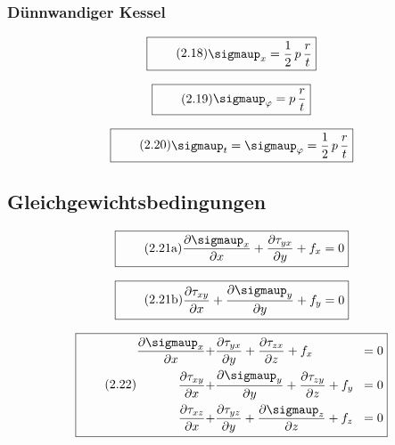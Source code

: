 \documentclass[11pt]{article}
\newcommand{\1}{ {\mathds{1}} }
\renewcommand{\sigma  }{\sigmaup   }
\begin{document}
		\subsubsection{Dünnwandiger Kessel}

		\begin{equation}
			\boxed{
				\tag{2.18}
				\begin{split}
					\sigma_x
					=
					\frac{1}{2} \,p\, \frac{r}{t}
				\end{split}
			}
		\end{equation}

		\begin{equation}
			\boxed{
				\tag{2.19}
				\begin{split}
					\sigma_{\varphi}
					=
					p\,
					\frac{r}{t}
				\end{split}
			}
		\end{equation}

		\begin{equation}
			\boxed{
				\tag{2.20}
				\begin{split}
					\sigma_t
					=
					\sigma_\varphi
					=
					\frac{1}{2}\,p\,\frac{r}{t}
				\end{split}
			}
		\end{equation}

		\subsection{Gleichgewichtsbedingungen}

		\begin{equation}
			\boxed{
				\tag{2.21a}
				\begin{split}
					\frac{\partial\sigma_x}{\partial x}
					+
					\frac{\partial\tau_{yx}}{\partial y}
					+
					f_x
					=
					0
				\end{split}
			}
		\end{equation}

		\begin{equation}
			\boxed{
				\tag{2.21b}
				\begin{split}
					\frac{\partial\tau_{xy}}{\partial x}
					+
					\frac{\partial\sigma_{y}}{\partial y}
					+
					f_y
					=
					0
				\end{split}
			}
		\end{equation}

		\begin{equation}
			\boxed{
				\tag{2.22}
				\begin{split}
					\frac{\partial\sigma_{x}}{\partial x}
					+
					&\frac{\partial\tau_{yx}}{\partial y}
					+
					\frac{\partial\tau_{zx}}{\partial z}
					+
					f_x\!&= 0 \\
					\frac{\partial\tau_{xy}}{\partial x}
					+
					&\frac{\partial\sigma_{y}}{\partial y}
					+
					\frac{\partial\tau_{zy}}{\partial z}
					+
					f_y\!&= 0 \\
					\frac{\partial\tau_{xz}}{\partial x}
					+
					&\frac{\partial\tau_{yz}}{\partial y}
					+
					\frac{\partial\sigma_{z}}{\partial z}
					+
					f_z\!&= 0 \\
				\end{split}
			}
		\end{equation}		
\end{document}
